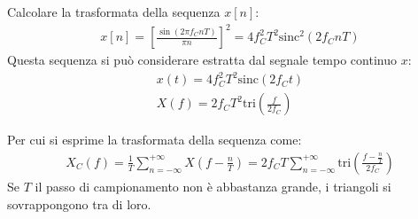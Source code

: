 \documentclass{article}
\begin{document}
Calcolare la trasformata della sequenza $x[n]$:
\begin{gather*}
    x[n]=\left[\displaystyle\frac{\sin(2\pi f_CnT)}{\pi n}\right]^2=4f_C^2T^2\mbox{sinc}^2(2f_CnT)
\end{gather*}
Questa sequenza si può considerare estratta dal segnale tempo continuo $x$:
\begin{gather*}
    x(t)=4f_C^2T^2\mbox{sinc}(2f_Ct)\\
    X(f)=\displaystyle 2f_CT^2\mbox{tri}\left(\frac{f}{2f_C}\right)
\end{gather*}

Per cui si esprime la trasformata della sequenza come:
\begin{gather}
    X_C(f)=\displaystyle\frac{1}{T}\sum_{n=-\infty}^{+\infty}X\left(f-\frac{n}{T}\right)=2f_CT\sum_{n=-\infty}^{+\infty}\mbox{tri}\left(\frac{f-\frac{n}{T}}{2f_C}\right)
\end{gather}
Se $T$ il passo di campionamento non è abbastanza grande, i triangoli si sovrappongono tra di loro. 
\end{document}
